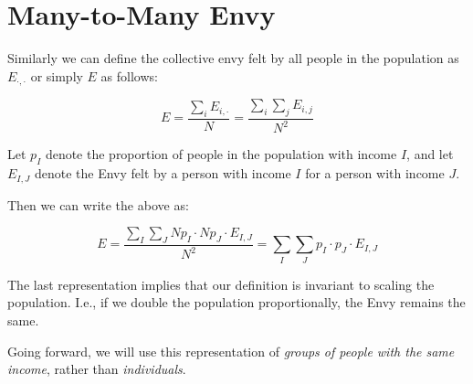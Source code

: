\section{Many-to-Many Envy}

Similarly we can define the collective envy felt by all people in the population as $E_{\cdot,\cdot}$ or simply $E$ as follows:

\begin{equation}
    E = \frac{\sum_{i} E_{i, \cdot}}{N} 
    = \frac{\sum_{i} \sum_{j} E_{i,j}}{N^2}
\end{equation}

Let ${p_I}$ denote the proportion of people in the population with income $I$, and let $E_{I, J}$ denote the Envy felt by a person with income $I$ for a person with income $J$.

Then we can write the above as:

\begin{equation}
    E = \frac{\sum_{I} \sum_{J} Np_I  \cdot Np_J  \cdot E_{I,J}}{N^2} = \sum_{I} \sum_{J} p_I  \cdot p_J  \cdot E_{I,J}
\end{equation}

The last representation implies that our definition is invariant to scaling the population. I.e., if we double the population proportionally, the Envy remains the same.

Going forward, we will use this representation of \textit{groups of people with the same income}, rather than \textit{individuals}.



